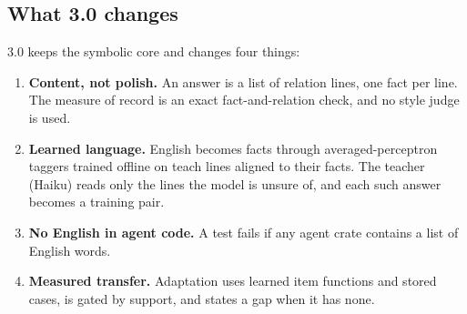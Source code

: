 \subsection{What 3.0 changes}
3.0 keeps the symbolic core and changes four things:
\begin{enumerate}
  \item \textbf{Content, not polish.} An answer is a list of relation lines, one fact per line. The measure of record is an exact fact-and-relation check, and no style judge is used.
  \item \textbf{Learned language.} English becomes facts through averaged-perceptron taggers trained offline on teach lines aligned to their facts. The teacher (Haiku) reads only the lines the model is unsure of, and each such answer becomes a training pair.
  \item \textbf{No English in agent code.} A test fails if any agent crate contains a list of English words.
  \item \textbf{Measured transfer.} Adaptation uses learned item functions and stored cases, is gated by support, and states a gap when it has none.
\end{enumerate}

